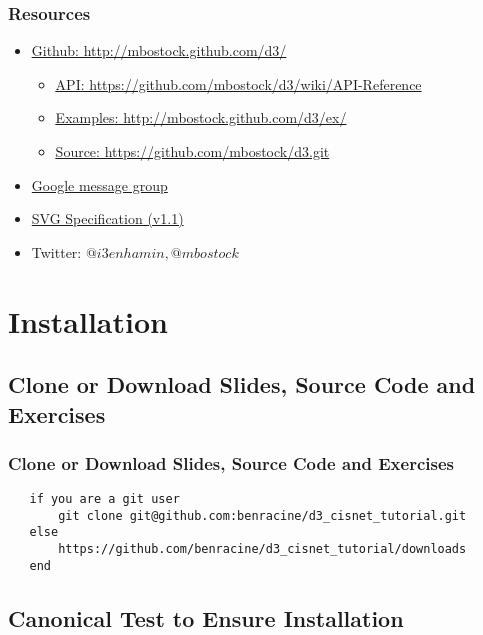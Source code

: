 \documentclass{beamer}
\begin{document}
\begin{frame}
    \frametitle{Resources}
\pause
        \begin{itemize}
        \item \href{http://mbostock.github.com/d3/}{\underline{Github}: http://mbostock.github.com/d3/}
\pause
            \begin{itemize}
            \item \href{https://github.com/mbostock/d3/wiki/API-Reference}{\underline{API}: https://github.com/mbostock/d3/wiki/API-Reference}
\pause
            \item \href{http://mbostock.github.com/d3/ex/}{\underline{Examples}: http://mbostock.github.com/d3/ex/}
\pause
            \item \href{https://github.com/mbostock/d3.git}{\underline{Source}: https://github.com/mbostock/d3.git}
            \end{itemize}
\pause
        \item \href{http://groups.google.com/group/d3-js?pli=1}{Google message group}
\pause
        \item \href{http://www.w3.org/TR/SVG/}{SVG Specification (v1.1)}
\pause
        \item Twitter: $@i3enhamin, @mbostock$
        \end{itemize}
\end{frame}



\section{Installation}

\subsection{Clone or Download Slides, Source Code and Exercises}

\begin{frame}[fragile]
    \frametitle{Clone or Download Slides, Source Code and Exercises}
        \tiny{
        \begin{verbatim}
   if you are a git user
       git clone git@github.com:benracine/d3_cisnet_tutorial.git
   else
       https://github.com/benracine/d3_cisnet_tutorial/downloads
   end
        \end{verbatim}
        }
\end{frame}



\subsection{Canonical Test to Ensure Installation}
\end{document}
